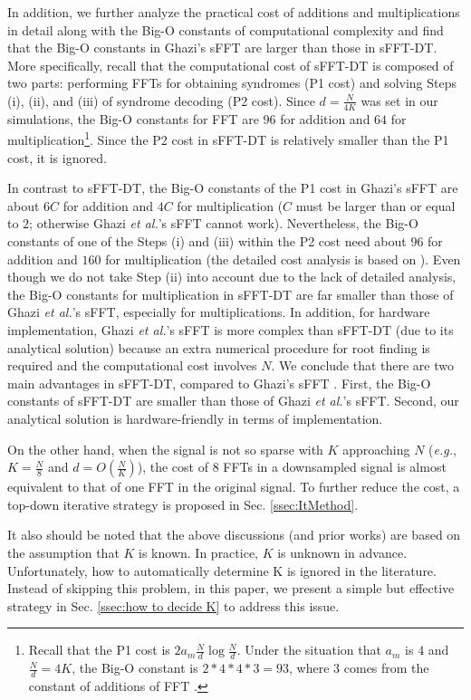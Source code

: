 \documentclass[journal,onecolumn,11pt]{IEEEtran}
\begin{document}
In addition, we further analyze the practical cost of additions and multiplications in detail along with the Big-O constants of computational complexity and find that the Big-O constants in Ghazi's sFFT are larger than those in sFFT-DT.
More specifically, recall that the computational cost of sFFT-DT is composed of two parts:
performing FFTs for obtaining syndromes (P1 cost) and solving Steps (i), (ii), and (iii) of syndrome decoding (P2 cost).
Since $d = \frac{N}{4K}$ was set in our simulations, the Big-O constants for FFT are $96$ for addition and $64$ for multiplication\footnote{Recall that the P1 cost is $2a_{m}\frac{N}{d}\log \frac{N}{d}$. Under the situation that $a_{m}$ is $4$ and $\frac{N}{d}= 4K$, the Big-O constant is $ 2*4*4*3 = 93 $, where $3$ comes from the constant of additions of FFT \cite{Saidi1994}.}.
Since the P2 cost in sFFT-DT is relatively smaller than the P1 cost, it is ignored.

In contrast to sFFT-DT, the Big-O constants of the P1 cost in Ghazi's sFFT \cite{Ghazi2013} are about $6C$ for addition and $4C$ for multiplication ($C$ must be larger than or equal to $2$; otherwise Ghazi {\em et al.}'s sFFT cannot work).
Nevertheless, the Big-O constants of one of the Steps (i) and (iii) within the P2 cost need about $96$ for addition and $160$ for multiplication (the detailed cost analysis is based on \cite{NChen2008}). Even though we do not take Step (ii) into account due to the lack of detailed analysis, the Big-O constants for multiplication in sFFT-DT are far smaller than those of Ghazi {\em et al.}'s sFFT, especially for multiplications.
In addition, for hardware implementation, Ghazi {\em et al.}'s sFFT is more complex than sFFT-DT (due to its analytical solution) because an extra numerical procedure for root finding is required and the computational cost involves $N$.
We conclude that there are two main advantages in sFFT-DT, compared to Ghazi's sFFT \cite{Ghazi2013}.
First, the Big-O constants of sFFT-DT are smaller than those of Ghazi {\em et al.}'s sFFT.
Second, our analytical solution is hardware-friendly in terms of implementation.

On the other hand, when the signal is not so sparse with $K$ approaching $N$ ({\em e.g.}, $  K=\frac{N}{8}$ and $d=O(\frac{N}{K})$), the cost of $8$ FFTs in a downsampled signal is almost equivalent to that of one FFT in the original signal.
To further reduce the cost, a top-down iterative strategy is proposed in Sec. \ref{ssec:ItMethod}.

It also should be noted that the above discussions (and prior works) are based on the assumption that $K$ is known.
In practice, $K$ is unknown in advance.
Unfortunately, how to automatically determine K is ignored in the literature.
Instead of skipping this problem, in this paper, we present a simple but effective strategy in Sec. \ref{ssec:how to decide K} to address this issue.
\end{document}
